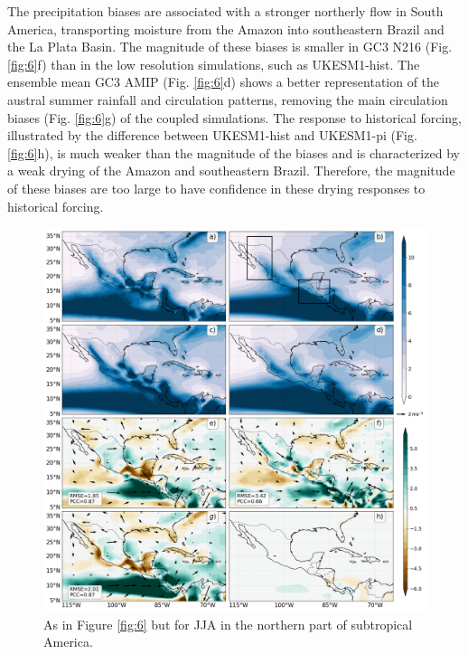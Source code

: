  


 The precipitation biases are associated with a stronger northerly flow in South America, transporting moisture from the Amazon into southeastern Brazil and the La Plata Basin.   
The magnitude of these biases is smaller in GC3 N216 (Fig. \ref{fig:6}f) than in the low resolution simulations, such as UKESM1-hist.   The ensemble mean GC3 AMIP (Fig. \ref{fig:6}d) shows a better representation of the austral summer rainfall and circulation patterns, removing the main circulation biases (Fig. \ref{fig:6}g) of the coupled simulations.   
The response to historical forcing, illustrated by the difference between UKESM1-hist and UKESM1-pi (Fig. \ref{fig:6}h), is much weaker than the magnitude of the biases and is characterized by a weak drying of the Amazon and southeastern Brazil. Therefore, the magnitude of these biases are too large to have confidence in these drying responses to historical forcing. 


\begin{figure}[t!]
\centering
 \includegraphics[width=0.9\linewidth]{figures/Fig8.png}
\caption[Boreal summer precipitation in the North American Monsoon]{ As in Figure \ref{fig:6} but for JJA in the northern part of subtropical America.   }
\label{fig:7}
\end{figure}

